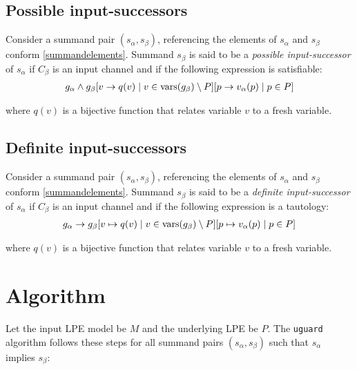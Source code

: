 \subsection{Possible input-successors}

Consider a summand pair $(s_\alpha, s_\beta)$, referencing the elements of $s_\alpha$ and $s_\beta$ conform \ref{summandelements}.
Summand $s_\beta$ is said to be a \emph{possible input-successor} of $s_\alpha$ if $C_\beta$ is an input channel and if the following expression is satisfiable:
\begin{align*}
g_\alpha \land {g_\beta}[v \rightarrow q(v) \;|\; v \in \text{vars}(g_\beta) \setminus P][p \rightarrow v_\alpha(p) \;|\; p \in P]
\end{align*}

where $q(v)$ is a bijective function that relates variable $v$ to a fresh variable.

\subsection{Definite input-successors}

Consider a summand pair $(s_\alpha, s_\beta)$, referencing the elements of $s_\alpha$ and $s_\beta$ conform \ref{summandelements}.
Summand $s_\beta$ is said to be a \emph{definite input-successor} of $s_\alpha$ if $C_\beta$ is an input channel and if the following expression is a tautology:
\begin{align*}
g_\alpha \rightarrow {g_\beta}[v \mapsto q(v) \;|\; v \in \text{vars}(g_\beta) \setminus P][p \mapsto v_\alpha(p) \;|\; p \in P]
\end{align*}

where $q(v)$ is a bijective function that relates variable $v$ to a fresh variable.

\section{Algorithm}

Let the input LPE model be $M$ and the underlying LPE be $P$.
The \texttt{uguard} algorithm follows these steps for all summand pairs $(s_\alpha, s_\beta)$ such that $s_\alpha$ implies $s_\beta$:

